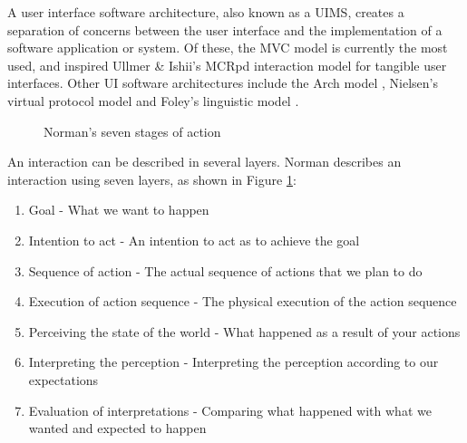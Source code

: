 
A user interface software architecture, also known as a \ac{UIMS}, creates a separation of concerns between the user interface and the implementation of a software application or system. Of these, the \ac{MVC} model is currently the most used, and inspired Ullmer \& Ishii's \cite{Ullmer2000} \ac{MCRpd} interaction model for tangible user interfaces. Other UI software architectures include the Arch model \cite{Bass1992}, Nielsen's virtual protocol model \cite{Nielsen1986} and Foley's linguistic model \cite{Foley1996}.

\begin{figure}[bth]
	\centering
	\caption{Norman's seven stages of action}
	\label{sevenStages}
\end{figure}

	An interaction can be described in several layers. Norman \cite{Norman1998} describes an interaction using seven layers, as shown in Figure \ref{sevenStages}:

\begin{enumerate}	
	\item Goal - What we want to happen
	\item Intention to act - An intention to act as to achieve the goal
	\item Sequence of action - The actual sequence of actions that we plan to do
	\item Execution of action sequence - The physical execution of the action sequence
	\item Perceiving the state of the world - What happened as a result of your actions
	\item Interpreting the perception - Interpreting the perception according to our expectations
	\item Evaluation of interpretations - Comparing what happened with what we wanted and expected to happen
\end{enumerate}
	
